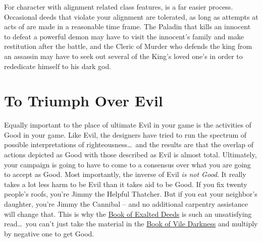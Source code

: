 For character with alignment related class features,  is a far easier process. Occasional deeds that violate your alignment are tolerated, as long as attempts at acts of  are made in a reasonable time frame. The Paladin that kills an innocent to defeat a powerful demon may have to visit the innocent's family and make restitution after the battle, and the Cleric of Murder who defends the king from an assassin may have to seek out several of the King's loved one's in order to rededicate himself to his dark god.




\section{To Triumph Over Evil}

Equally important to the place of ultimate Evil in your game is the activities of Good in your game. Like Evil, the designers have tried to run the spectrum of possible interpretations of righteousness\ldots\  and the results are that the overlap of actions depicted as Good with those described as Evil is almost total. Ultimately, your campaign is going to have to come to a consensus over what you are going to accept as Good. Most importantly, the inverse of Evil \textit{is not Good}. It really takes a lot less harm to be Evil than it takes aid to be Good. If you fix twenty people's roofs, you're Jimmy the Helpful Thatcher. But if you eat your neighbor's daughter, you're Jimmy the Cannibal -- and no additional carpentry assistance will change that. This is why the \underline{Book of Exalted Deeds} is such an unsatisfying read\ldots\  you can't just take the material in the \underline{Book of Vile Darkness} and multiply by negative one to get Good.



